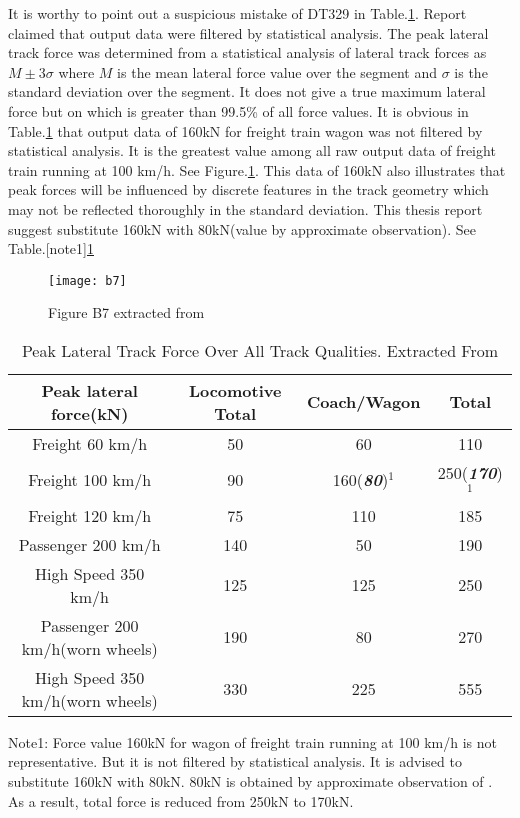 It is worthy to point out a suspicious mistake of DT329 in Table.\ref{tab:peaklateralforce}. Report claimed that output data were filtered by statistical analysis. The peak lateral track force was determined from a statistical analysis of lateral track forces as $M \pm 3\sigma$ where $M$ is the mean lateral force value over the segment and $\sigma$ is the standard deviation over the segment. It does not give a true maximum lateral force but on which is greater than 99.5\% of all force values. It is obvious in Table.\ref{tab:peaklateralforce} that output data of 160kN for freight train wagon was not filtered by statistical analysis. It is the greatest value among all raw output data of freight train running at 100 km/h. See Figure.\ref{fig:b7}. This data of 160kN also illustrates that 
peak forces will be influenced by discrete features in the track geometry which may not be reflected thoroughly in the standard deviation. This thesis report suggest substitute 160kN with 80kN(value by approximate observation). See Table.[note1]\ref{tab:peaklateralforce}

\begin{figure}[h!]
    \centering
    \texttt{[image: b7]}
    \caption{Figure B7 extracted from \citet{d181dt329}}
    \label{fig:b7}
\end{figure}

\begin{table}[h!]
    \centering
    \caption{Peak Lateral Track Force Over All Track Qualities. Extracted From \citet[Tab. B1]{d181dt329}}
    \begin{tabular}{cccc}
        \hline
        Peak lateral force(kN) & Locomotive Total & Coach/Wagon & Total \\ 
        \hline
        Freight 60 km/h & 50 & 60 & 110\\
        Freight 100 km/h & 90 & 160(\textbf{\textit{80}})$^1$ & 250(\textbf{\textit{170}})$^1$\\
        Freight 120 km/h & 75 & 110 & 185 \\
        Passenger 200 km/h & 140 & 50 & 190 \\
        High Speed 350 km/h & 125 & 125 & 250 \\
        Passenger 200 km/h(worn wheels) & 190 & 80 & 270 \\
        High Speed 350 km/h(worn wheels) & 330 & 225 & 555 \\
        \hline
    \end{tabular}
    \begin{flushleft}
    Note1: Force value 160kN for wagon of freight train running at 100 km/h is not representative. But it is not filtered by statistical analysis. It is advised to substitute 160kN with 80kN. 80kN is obtained by approximate observation of \citet[Figure B7]{d181dt329}. As a result, total force is reduced from 250kN to 170kN.
    \end{flushleft}
    \label{tab:peaklateralforce}
\end{table}

